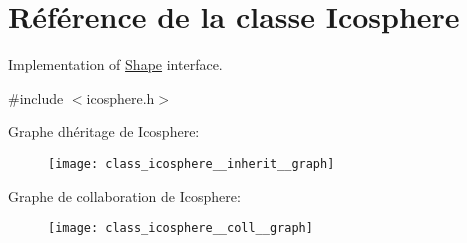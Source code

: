 \hypertarget{class_icosphere}{}\section{Référence de la classe Icosphere}
\label{class_icosphere}


Implementation of \hyperlink{class_shape}{Shape} interface.  




{\ttfamily \#include $<$icosphere.\+h$>$}



Graphe d\textquotesingle{}héritage de Icosphere\+:\nopagebreak
\begin{figure}[H]
\begin{center}
\leavevmode
\texttt{[image: class\_icosphere\_\_inherit\_\_graph]}
\end{center}
\end{figure}


Graphe de collaboration de Icosphere\+:\nopagebreak
\begin{figure}[H]
\begin{center}
\leavevmode
\texttt{[image: class\_icosphere\_\_coll\_\_graph]}
\end{center}
\end{figure}
